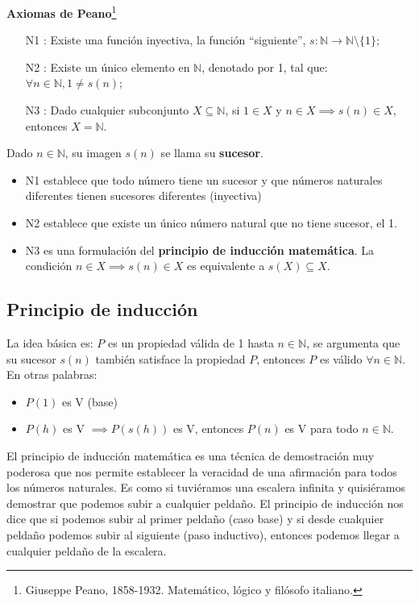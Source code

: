 \textbf{Axiomas de Peano}\footnote{Giuseppe Peano, 1858-1932. Matemático, lógico y filósofo italiano.} \label{sec:peano} 
\begin{itemize}
	\item[N1]: Existe una función inyectiva, la función ``siguiente'', $s: \mathbb{N} \rightarrow \mathbb{N} \setminus \{1\}$;
	\item[N2]: Existe un único elemento en $\mathbb{N}$, denotado por 1, tal que: $\forall n \in \mathbb{N}, 1 \ne s(n)$;
	\item[N3]: Dado cualquier subconjunto $X \subseteq \mathbb{N}$, si $1 \in X$ y $n \in X \implies s(n) \in X$, entonces $X = \mathbb{N}$.
\end{itemize}
Dado $n \in \mathbb{N}$, su imagen $s(n)$ se llama su \textbf{sucesor}.
\begin{itemize}
	\item N1 establece que todo número tiene un sucesor y que números naturales diferentes tienen sucesores diferentes (inyectiva)
	\item N2 establece que existe un único número natural que no tiene sucesor, el 1.
	\item N3 es una formulación del \textbf{principio de inducción matemática}. La condición $n \in X \implies s(n) \in X$ es equivalente a $s(X) \subseteq X$.
\end{itemize}

\subsection{Principio de inducción} \label{sec:induccion}  
La idea básica es: $P$ es un propiedad válida de 1 hasta $n \in \mathbb{N}$, se argumenta que su sucesor $s(n)$ también satisface la propiedad $P$, entonces $P$ es válido $\forall n \in \mathbb{N}$. En otras palabras:

\begin{itemize}
	\item $P(1)$ es V (base)
	\item $P(h)$ es V $\implies P(s(h))$ es V, entonces $P(n)$ es V para todo $n \in \mathbb{N}$.
\end{itemize}

El principio de inducción matemática es una técnica de demostración muy poderosa que nos permite establecer la veracidad de una afirmación para todos los números naturales. Es como si tuviéramos una escalera infinita y quisiéramos demostrar que podemos subir a cualquier peldaño. El principio de inducción nos dice que si podemos subir al primer peldaño (caso base) y si desde cualquier peldaño podemos subir al siguiente (paso inductivo), entonces podemos llegar a cualquier peldaño de la escalera.

